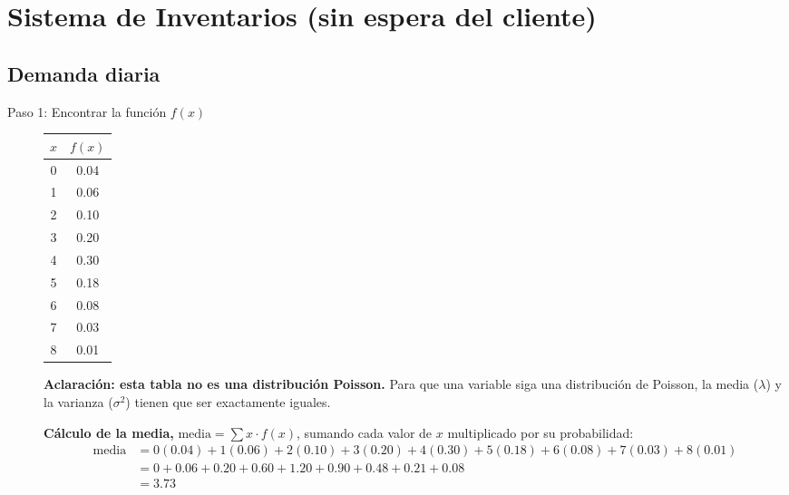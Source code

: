 \documentclass[12pt]{article}
\begin{document}
\section{Sistema de Inventarios (sin espera del cliente)}

\subsection{Demanda diaria}

\begin{description}
    \item[Paso 1: Encontrar la función $f(x)$]

    \begin{center}
    \begin{tabular}{cc}
    \toprule
    $x$ & $f(x)$ \\
    \midrule
    0 & 0.04 \\
    1 & 0.06 \\
    2 & 0.10 \\
    3 & 0.20 \\
    4 & 0.30 \\
    5 & 0.18 \\
    6 & 0.08 \\
    7 & 0.03 \\
    8 & 0.01 \\
    \bottomrule
    \end{tabular}
    \end{center}

    \textbf{Aclaración: esta tabla no es una distribución Poisson.} Para que una variable siga una distribución de Poisson, la media ($\lambda$) y la varianza ($\sigma^2$) tienen que ser exactamente iguales.

    \textbf{Cálculo de la media,} $\text{media} = \sum x \cdot f(x)$, sumando cada valor de $x$ multiplicado por su probabilidad:
    \begin{align*}
    \text{media} &= 0(0.04) + 1(0.06) + 2(0.10) + 3(0.20) + 4(0.30) + 5(0.18) + 6(0.08) + 7(0.03) + 8(0.01) \\
    &= 0 + 0.06 + 0.20 + 0.60 + 1.20 + 0.90 + 0.48 + 0.21 + 0.08 \\
    &= 3.73
    \end{align*}


\end{description}
\end{document}
